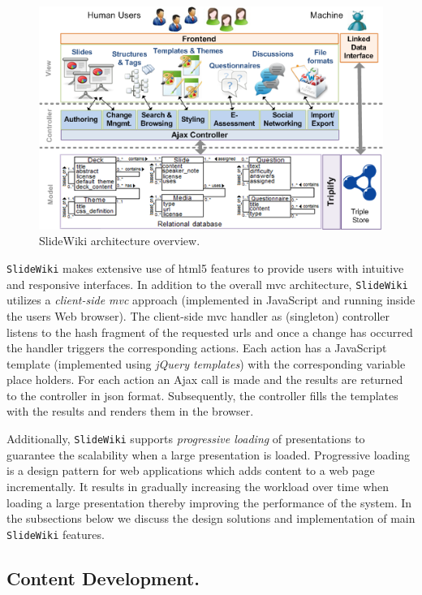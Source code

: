 \documentclass[PhD, Submit, ngerman,UKenglish,table]{scrbook}
\begin{document}
\begin{figure}[tb]
\centering
	\includegraphics[width=1\columnwidth]{images/architecture.png}
	\caption{SlideWiki architecture overview.}
	\label{fig:SlideWiki_architecture}
\end{figure}

\texttt{SlideWiki} makes extensive use of \gls{html}5 features to provide users with intuitive and responsive interfaces.
In addition to the overall \gls{mvc} architecture, \texttt{SlideWiki} utilizes a \emph{client-side \gls{mvc}} approach (implemented in JavaScript and running inside the users Web browser).
The client-side \gls{mvc} handler as (singleton) controller listens to the hash fragment of the requested \gls{url}s and once a change has occurred the handler triggers the corresponding actions.
Each action has a JavaScript template (implemented using \textit{jQuery templates}) with the corresponding variable place holders.
For each action an Ajax call is made and the results are returned to the controller in \gls{json} format.
Subsequently, the controller fills the templates with the results and renders them in the browser.

Additionally, \texttt{SlideWiki} supports \emph{progressive loading} of presentations to guarantee the scalability when a large presentation is loaded.
Progressive loading is a design pattern for web applications which adds content to a web page incrementally. 
It results in gradually increasing the workload over time when loading a large presentation thereby improving the performance of the system.
In the subsections below we discuss the design solutions and implementation of main \texttt{SlideWiki} features. 

\subsection{Content Development.}
\label{sec:content_development_implementation}
\end{document}
